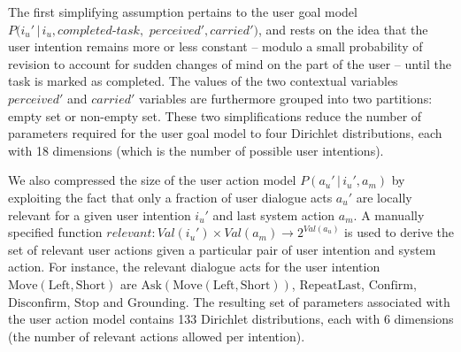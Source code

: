 The first simplifying assumption pertains to the user goal model $P(i_u' \, | \, i_u, \mathit{completed\mbox{-}task},$ $\mathit{perceived}', \mathit{carried}')$, and rests on the idea that the user intention remains more or less constant -- modulo a small probability of revision to account for sudden changes of mind on the part of the user -- until the task is marked as completed. The values of the two contextual variables $\mathit{perceived}'$ and $\mathit{carried}'$ variables are furthermore grouped into two partitions: empty set or non-empty set. These two simplifications reduce the number of parameters required for the user goal model to four Dirichlet distributions, each with 18 dimensions (which is the number of possible user intentions). 


We also compressed the size of the user action model $P(a_u'\, | \, i_u', a_m)$ by exploiting the fact that only a fraction of user dialogue acts $a_u'$ are locally relevant for a given user intention $i_u'$ and last system action $a_m$.  A manually specified function $relevant: \mathit{Val}(i_u') \times \mathit{Val}(a_m) \rightarrow 2^{\mathit{Val}(a_u)}$ is used to derive the set of relevant user actions given a particular pair of user intention and system action. For instance, the relevant dialogue acts for the user intention $\mathrm{Move(Left,Short)}$ are $\mathrm{Ask(Move(Left,Short))}$, $\mathrm{RepeatLast}$, $\mathrm{Confirm}$, $\mathrm{Disconfirm}$, $\mathrm{Stop}$ and $\mathrm{Grounding}$. The resulting set of parameters associated with the user action model contains 133 Dirichlet distributions, each with 6 dimensions (the number of relevant actions allowed per intention). 

